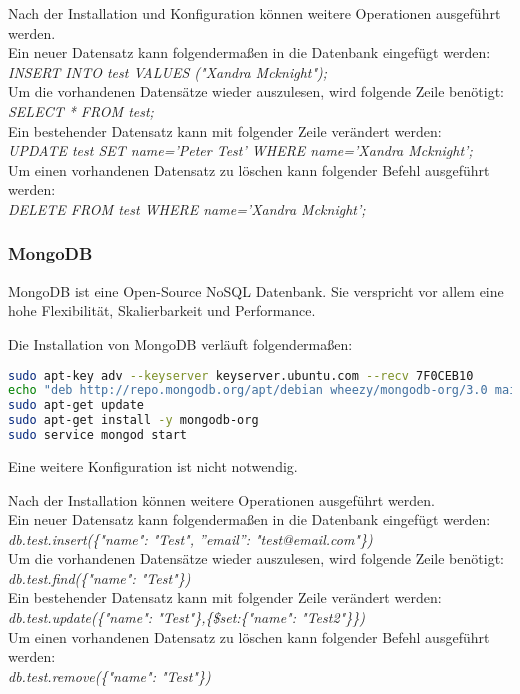 Nach der Installation und Konfiguration können weitere Operationen ausgeführt werden.\\
Ein neuer Datensatz kann folgendermaßen in die Datenbank eingefügt werden:\\
\textit{INSERT INTO test VALUES ("Xandra Mcknight");}\\
Um die vorhandenen Datensätze wieder auszulesen, wird folgende Zeile benötigt:\\
\textit{SELECT * FROM test;}\\
Ein bestehender Datensatz kann mit folgender Zeile verändert werden:\\
\textit{UPDATE test SET name='Peter Test' WHERE name='Xandra Mcknight';}\\
Um einen vorhandenen Datensatz zu löschen kann folgender Befehl ausgeführt werden:\\
\textit{DELETE FROM test WHERE name='Xandra Mcknight';}

\subsubsection{MongoDB}
MongoDB ist eine Open-Source NoSQL Datenbank. Sie verspricht vor allem eine hohe Flexibilität, Skalierbarkeit und Performance. \cite{ABOUTMONGODB}

Die Installation von MongoDB verläuft folgendermaßen:
\begin{lstlisting}[caption=Installation von MongoDB \cite{MONGODBINSTALL}, language=bash]
sudo apt-key adv --keyserver keyserver.ubuntu.com --recv 7F0CEB10
echo "deb http://repo.mongodb.org/apt/debian wheezy/mongodb-org/3.0 main" | sudo tee /etc/apt/sources.list.d/mongodb-org-3.0.list
sudo apt-get update
sudo apt-get install -y mongodb-org
sudo service mongod start
\end{lstlisting}
Eine weitere Konfiguration ist nicht notwendig.

Nach der Installation können weitere Operationen ausgeführt werden.\\
Ein neuer Datensatz kann folgendermaßen in die Datenbank eingefügt werden:\\
\textit{db.test.insert(\{"name": "Test", ''email'': "test@email.com"\})}\\
Um die vorhandenen Datensätze wieder auszulesen, wird folgende Zeile benötigt:\\
\textit{db.test.find(\{"name": "Test"\})}\\
Ein bestehender Datensatz kann mit folgender Zeile verändert werden:\\
\textit{db.test.update(\{"name": "Test"\},\{\$set:\{"name": "Test2"\}\})}\\
Um einen vorhandenen Datensatz zu löschen kann folgender Befehl ausgeführt werden:\\
\textit{db.test.remove(\{"name": "Test"\})}

